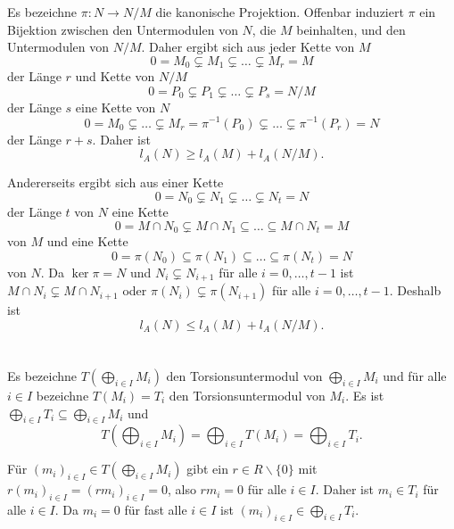 \documentclass[a4paper,10pt]{article}
\theoremstyle{definition}
\begin{document}
Es bezeichne $\pi : N \rightarrow N/M$ die kanonische Projektion. Offenbar induziert $\pi$ ein Bijektion zwischen den Untermodulen von $N$, die $M$ beinhalten, und den Untermodulen von $N/M$. Daher ergibt sich aus jeder Kette von $M$
\[
 0 = M_0 \subsetneq M_1 \subsetneq \ldots \subsetneq M_r = M
\]
der Länge $r$ und Kette von $N/M$
\[
 0 = P_0 \subsetneq P_1 \subsetneq \ldots \subsetneq P_s = N/M
\]
der Länge $s$ eine Kette von $N$
\[
 0 = M_0 \subsetneq \ldots \subsetneq M_r = \pi^{-1}(P_0) \subsetneq \ldots \subsetneq \pi^{-1}(P_r) = N
\]
der Länge $r+s$. Daher ist
\[
 l_A(N) \geq l_A(M) + l_A(N/M).
\]

Andererseits ergibt sich aus einer Kette
\[
 0 = N_0 \subsetneq N_1 \subsetneq \ldots \subsetneq N_t = N
\]
der Länge $t$ von $N$ eine Kette
\[
 0 = M \cap N_0 \subsetneq M \cap N_1 \subseteq \ldots \subseteq M \cap N_t = M
\]
von $M$ und eine Kette
\[
 0 = \pi(N_0) \subseteq \pi(N_1) \subseteq \ldots \subseteq \pi(N_t) = N
\]
von $N$. Da $\ker \pi = N$ und $N_i \subsetneq N_{i+1}$ für alle $i=0, \ldots, t-1$ ist $M \cap N_i \subsetneq M \cap N_{i+1}$ oder $\pi(N_i) \subsetneq \pi(N_{i+1})$ für alle $i=0, \ldots, t-1$. Deshalb ist
\[
 l_A(N) \leq l_A(M) + l_A(N/M).
\]





\section{}





\section{}


\subsection{}
Es bezeichne $T(\bigoplus_{i \in I} M_i)$ den Torsionsuntermodul von $\bigoplus_{i \in I} M_i$ und für alle $i \in I$ bezeichne $T(M_i) = T_i$ den Torsionsuntermodul von $M_i$. Es ist $\bigoplus_{i \in I} T_i \subseteq \bigoplus_{i \in I} M_i$ und
\[
 T\left( \bigoplus_{i \in I} M_i \right) = \bigoplus_{i \in I} T(M_i) = \bigoplus_{i \in I} T_i.
\]

Für $(m_i)_{i \in I} \in T\left( \bigoplus_{i \in I} M_i \right)$ gibt ein $r \in R \smallsetminus \{0\}$ mit $r(m_i)_{i \in I} = (rm_{i})_{i \in I} = 0$, also $rm_i = 0$ für alle $i \in I$. Daher ist $m_i \in T_i$ für alle $i \in I$. Da $m_i = 0$ für fast alle $i \in I$ ist $(m_i)_{i \in I} \in \bigoplus_{i \in I} T_i$.
\end{document}
